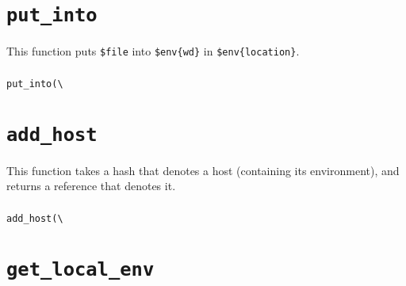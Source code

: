 \documentclass[a4paper,10pt]{report}
\def\|{\verb|} %|
\begin{document}
\section{\texttt{put\_into}}

This function puts \texttt{\$file} into \texttt{\$env\{wd\}} in
\texttt{\$env\{location\}}.

\subsubsection{\format}

\begin{boxnote}
\begin{alltt}
put_into(\|\|%\textit{env}, $file);
\end{alltt}
\end{boxnote}
\vspace{\baselineskip}


\section{\texttt{add\_host}}

This function takes a hash that denotes a host (containing its
environment), and returns a reference that denotes it.

\subsubsection{\format}

\begin{boxnote}
\begin{alltt}
add_host(\|\|%\textit{env});
\end{alltt}
\end{boxnote}

\subsubsection{\example}


\section{\texttt{get\_local\_env}}
\end{document}
